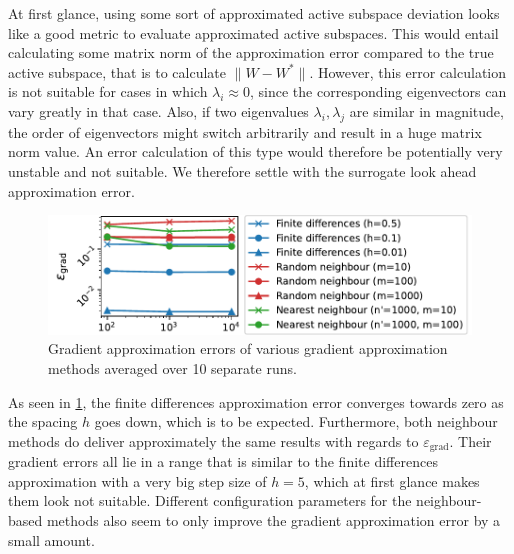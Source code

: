 \documentclass[
  a4paper,  %
  twoside,  %
  bibliography=totoc,
  headsepline,
  cleardoublepage=empty,
  parskip=half,
  draft=false
]{scrbook}
\begin{document}
At first glance, using some sort of approximated active subspace deviation looks like a good metric to evaluate approximated active subspaces.
This would entail calculating some matrix norm of the approximation error compared to the true active subspace, that is to calculate $\| W - W^\ast \|$.
However, this error calculation is not suitable for cases in which $\lambda_i \approx 0$, since the corresponding eigenvectors can vary greatly in that case.
Also, if two eigenvalues $\lambda_i, \lambda_j$ are similar in magnitude, the order of eigenvectors might switch arbitrarily and result in a huge matrix norm value.
An error calculation of this type would therefore be potentially very unstable and not suitable.
We therefore settle with the surrogate look ahead approximation error.

\begin{mdframed}[style=style]
\begin{figure}[H]
	\includegraphics[width=\textwidth]{graphics/ww_as_grad_errors}
\delimit
	\caption{Gradient approximation errors of various gradient approximation methods averaged over 10 separate runs.}
	\label{fig:ww_as_grad}
\end{figure}
\end{mdframed}
%
As seen in \cref{fig:ww_as_grad}, the finite differences approximation error converges towards zero as the spacing $h$ goes down, which is to be expected.
Furthermore, both neighbour methods do deliver approximately the same results with regards to $\varepsilon_{\mathrm{grad}}$.
Their gradient errors all lie in a range that is similar to the finite differences approximation with a very big step size of $h=5$, which at first glance makes them look not suitable.
Different configuration parameters for the neighbour-based methods also seem to only improve the gradient approximation error by a small amount.
\end{document}
